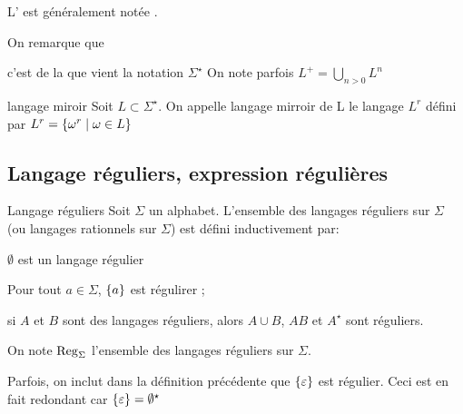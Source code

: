    \begin{notation}
        L' est généralement notée .
    \end{notation}
    
    On remarque que
    \begin{enumerate}
        \itt c'est de la que vient la notation $\Sigma^\star$
        \itt On note parfois $L^+ = \bigcup_{n > 0} L^n$
    \end{enumerate}
    
    \begin{definition}{langage miroir}{}
        Soit $L \subset \Sigma^\star$. On appelle langage mirroir de L le langage $L^r$ défini par $L^r = \left\{\omega^r \;\middle\vert\; \omega \in L\right\}$
        
    \end{definition}
    
    \subsection{Langage réguliers, expression régulières}
    
    \begin{definition}{Langage réguliers}{} 
        Soit $\Sigma$ un alphabet. L'ensemble des langages réguliers sur $\Sigma$ (ou langages rationnels sur $\Sigma$) est défini inductivement par: 
        \begin{enumerate}
            \itast $\emptyset$ est un langage régulier
            
            \itast  Pour tout $a \in \Sigma$, $\left\{a\right\}$ est régulirer ;
            
            \itast si $A$ et $B$ sont des langages réguliers, alors $A \cup B$, $AB$ et $A^\star$ sont réguliers.
            
        \end{enumerate}
    \end{definition}
    \begin{notation}
        On note $\operatorname{Reg}_\Sigma$ l'ensemble des langages réguliers sur $\Sigma$.
    \end{notation}
    
    Parfois, on inclut dans la définition précédente que $\left\{\varepsilon\right\}$ est régulier. Ceci est en fait redondant car $\left\{\varepsilon\right\} = \emptyset^\star$
    
